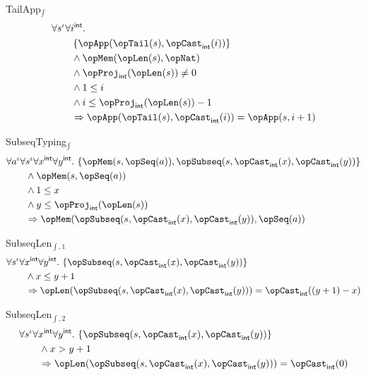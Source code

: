 \documentclass[11pt, a4paper, oneside]{article}
\begin{document}
\begin{axioms}
\item[TailApp$_\int$] \[
        \begin{aligned}
            &\forall s^\idv \forall i^\int. \\
            &\qquad \st{ \opApp(\opTail(s), \opCast_\int(i)) } \\
            &\qquad \wedge \opMem(\opLen(s), \opNat) \\
            &\qquad \wedge \opProj_\int(\opLen(s)) \neq 0 \\
            &\qquad \wedge 1 \le i \\
            &\qquad \wedge i \le \opProj_\int(\opLen(s)) - 1 \\
            &\qquad \imp \opApp(\opTail(s), \opCast_\int(i)) = \opApp(s, i + 1)
        \end{aligned}
    \]

\item[SubseqTyping$_\int$] \[
        \begin{aligned}
            &\forall a^\idv \forall s^\idv \forall x^\int \forall y^\int.\, \st{ \opMem(s, \opSeq(a)), \opSubseq(s, \opCast_\int(x), \opCast_\int(y)) } \\
            &\qquad \wedge \opMem(s, \opSeq(a)) \\
            &\qquad \wedge 1 \le x \\
            &\qquad \wedge y \le \opProj_\int(\opLen(s)) \\
            &\qquad \imp \opMem(\opSubseq(s, \opCast_\int(x), \opCast_\int(y)), \opSeq(a))
        \end{aligned}
    \]

\item[SubseqLen$_{\int,1}$] \[
        \begin{aligned}
            &\forall s^\idv \forall x^\int \forall y^\int.\, \st{ \opSubseq(s, \opCast_\int(x), \opCast_\int(y)) } \\
            &\qquad \wedge x \le y + 1 \\
            &\qquad \imp \opLen(\opSubseq(s, \opCast_\int(x), \opCast_\int(y))) = \opCast_\int((y + 1) - x)
        \end{aligned}
    \]

\item[SubseqLen$_{\int,2}$] \[
        \begin{aligned}
            &\forall s^\idv \forall x^\int \forall y^\int.\, \st{ \opSubseq(s, \opCast_\int(x), \opCast_\int(y)) } \\
            &\qquad \wedge x > y + 1 \\
            &\qquad \imp \opLen(\opSubseq(s, \opCast_\int(x), \opCast_\int(y))) = \opCast_\int(0)
        \end{aligned}
    \]


\end{axioms}
\end{document}
